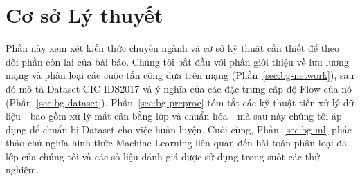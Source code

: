 \section{Cơ sở Lý thuyết}
\label{sec:background}

Phần này xem xét kiến thức chuyên ngành và cơ sở kỹ thuật cần thiết để theo dõi phần còn lại của bài báo. Chúng tôi bắt đầu với phần giới thiệu về lưu lượng mạng và phân loại các cuộc tấn công dựa trên mạng (Phần~\ref{sec:bg-network}), sau đó mô tả Dataset CIC-IDS2017 và ý nghĩa của các đặc trưng cấp độ Flow của nó (Phần~\ref{sec:bg-dataset}). Phần~\ref{sec:bg-preproc} tóm tắt các kỹ thuật tiền xử lý dữ liệu---bao gồm xử lý mất cân bằng lớp và chuẩn hóa---mà sau này chúng tôi áp dụng để chuẩn bị Dataset cho việc huấn luyện. Cuối cùng, Phần~\ref{sec:bg-ml} phác thảo chủ nghĩa hình thức Machine Learning liên quan đến bài toán phân loại đa lớp của chúng tôi và các số liệu đánh giá được sử dụng trong suốt các thử nghiệm.





